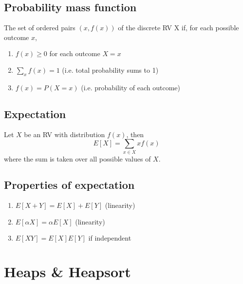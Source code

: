 \documentclass{article}
\begin{document}
\subsection{Probability mass function}
    \begin{definition}
        The set of ordered pairs $(x,f(x))$ of the discrete RV X if, for each possible outcome $x$, 
        \begin{enumerate}
            \item $f(x) \geq 0$ for each outcome $X=x$ 
            \item $\sum_{x} f(x) = 1$ (i.e. total probability sums to 1)
            \item $f(x) = P(X=x)$ (i.e. probability of each outcome)
        \end{enumerate}
    \end{definition}
    
\subsection{Expectation}
    \begin{definition}
        Let $X$ be an RV with distribution $f(x)$, then 
        \begin{equation}
            E[X] = \sum_{x\in X} xf(x)
        \end{equation}
        where the sum is taken over all possible values of $X$.
    \end{definition}

\subsection{Properties of expectation}
    \begin{definition}
        
        \begin{enumerate}
            \item $E[X+Y] = E[X] + E[Y]$ (linearity)
            \item $E[\alpha X] = \alpha E[X]$ (linearity)
            \item $E[XY] = E[X]E[Y]$ if independent
        \end{enumerate}
    \end{definition}
\newpage

\section{Heaps \& Heapsort}
\end{document}
